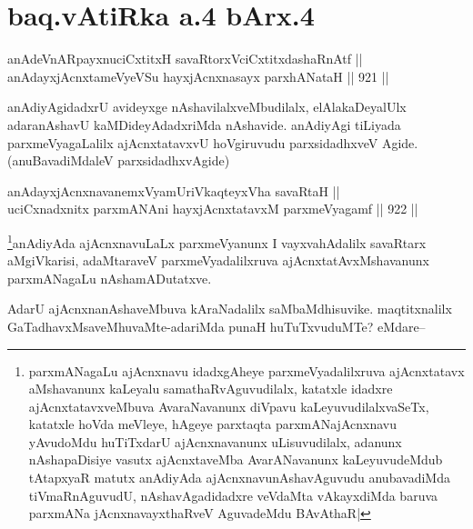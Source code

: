 \section*{baq.vAtiRka a.4 bArx.4}


\begin{shl}
anAdeVnARpayxnuciCxtitxH savaRtorxVciCxtitxdashaRnAtf || \\
anAdayxjAcnxtameVyeVSu hayxjAcnxnasayx parxhANataH ||  921 ||  
\end{shl}

\begin{artha}
anAdiyAgidadxrU avideyxge nAshavilalxveMbudilalx, elAlakaDeyalUlx adaranAshavU kaMDideyAdadxriMda nAshavide. anAdiyAgi tiLiyada parxmeVyagaLalilx ajAcnxtatavxvU hoVgiruvudu parxsidadhxveV Agide.(anuBavadiMdaleV parxsidadhxvAgide)
\end{artha}


\begin{shl}
anAdayxjAcnxnavanemxVyamUriVkaqteyxVha savaRtaH || \\
uciCxnadxnitx parxmANAni hayxjAcnxtatavxM parxmeVyagamf ||  922 ||  
\end{shl}

\begin{artha}
\footnote{parxmANagaLu ajAcnxnavu idadxgAheye parxmeVyadalilxruva ajAcnxtatavx aMshavanunx kaLeyalu samathaRvAguvudilalx, katatxle idadxre ajAcnxtatavxveMbuva AvaraNavanunx diVpavu kaLeyuvudilalxvaSeTx, katatxle hoVda meVleye, hAgeye parxtaqta parxmANajAcnxnavu yAvudoMdu huTiTxdarU ajAcnxnavanunx uLisuvudilalx, adanunx nAshapaDisiye vasutx ajAcnxtaveMba AvarANavanunx kaLeyuvudeMdub tAtapxyaR matutx anAdiyAda ajAcnxnavunAshavAguvudu anubavadiMda tiVmaRnAguvudU, nAshavAgadidadxre veVdaMta vAkayxdiMda baruva parxmANa jAcnxnavayxthaRveV AguvadeMdu BAvAthaR|}anAdiyAda ajAcnxnavuLaLx parxmeVyanunx I vayxvahAdalilx  savaRtarx aMgiVkarisi, adaMtaraveV parxmeVyadalilxruva ajAcnxtatAvxMshavanunx parxmANagaLu nAshamADutatxve.
\end{artha}

\begin{artha}
AdarU ajAcnxnanAshaveMbuva kAraNadalilx saMbaMdhisuvike. maqtitxnalilx GaTadhavxMsaveMhuvaMte-adariMda punaH huTuTxvuduMTe? eMdare--
\end{artha}

